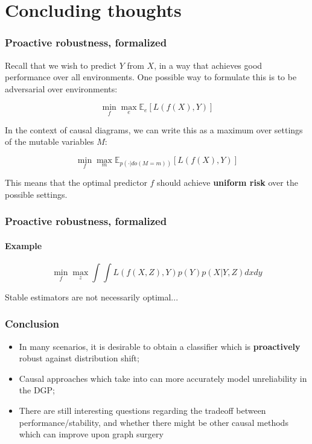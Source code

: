 \documentclass{beamer}
\begin{document}
\section{Concluding thoughts}

\begin{frame}
\frametitle{Proactive robustness, formalized}

Recall that we wish to predict $Y$ from $X$, in a way that achieves good performance over all environments. One possible way to formulate this is to be adversarial over environments:

$$\min_{f} \max_{e} \mathbb{E}_e \left[L(f(X), Y)\right]$$

In the context of causal diagrams, we can write this as a maximum over settings of the mutable variables $M$:

$$\min_{f} \max_{m} \mathbb{E}_{p(\cdot|do(M=m))} \left[L(f(X), Y)\right]$$

This means that the optimal predictor $f$ should achieve \textbf{uniform risk} over the possible settings.
\end{frame}

\begin{frame}
\frametitle{Proactive robustness, formalized}
\framesubtitle{Example}
\begin{center}
      \end{center}
      
$$\min_{f} \max_{z} \int \int L(f(X, Z), Y) p(Y) p(X|Y, Z) dx dy$$

Stable estimators are not necessarily optimal...
\end{frame}

\begin{frame}
\frametitle{Conclusion}

\begin{itemize}
	\item In many scenarios, it is desirable to obtain a classifier which is \textbf{proactively} robust against distribution shift;
	\item Causal approaches which take into can more accurately model unreliability in the DGP;
	\item There are still interesting questions regarding the tradeoff between performance/stability, and whether there might be other causal methods which can improve upon graph surgery
\end{itemize}
\end{frame}






\end{document}

